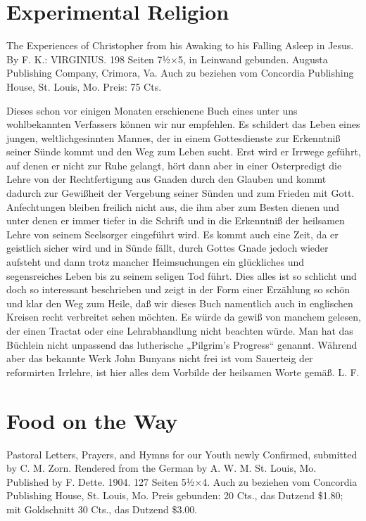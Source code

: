 \section[Experimental Religion]{Experimental Religion}
The Experiences of Christopher from his Awaking to his Falling Asleep in Jesus. By F. K.: VIRGINIUS. 198 Seiten 7½×5, in Leinwand gebunden. Augusta Publishing Company, Crimora, Va. Auch zu beziehen vom Concordia Publishing House, St. Louis, Mo. Preis: 75 Cts.

Dieses schon vor einigen Monaten erschienene Buch eines unter uns wohlbekannten Verfassers können wir nur empfehlen. Es schildert das Leben eines jungen, weltlichgesinnten Mannes, der in einem Gottesdienste zur Erkenntniß seiner Sünde kommt und den Weg zum Leben sucht. Erst wird er Irrwege geführt, auf denen er nicht zur Ruhe gelangt, hört dann aber in einer Osterpredigt die Lehre von der Rechtfertigung aus Gnaden durch den Glauben und kommt dadurch zur Gewißheit der Vergebung seiner Sünden und zum Frieden mit Gott. Anfechtungen bleiben freilich nicht aus, die ihm aber zum Besten dienen und unter denen er immer tiefer in die Schrift und in die Erkenntniß der heilsamen Lehre von seinem Seelsorger eingeführt wird. Es kommt auch eine Zeit, da er geistlich sicher wird und in Sünde fällt, durch Gottes Gnade jedoch wieder aufsteht und dann trotz mancher Heimsuchungen ein glückliches und segensreiches Leben bis zu seinem seligen Tod führt. Dies alles ist so schlicht und doch so interessant beschrieben und zeigt in der Form einer Erzählung so schön und klar den Weg zum Heile, daß wir dieses Buch namentlich auch in englischen Kreisen recht verbreitet sehen möchten. Es würde da gewiß von manchem gelesen, der einen Tractat oder eine Lehrabhandlung nicht beachten würde. Man hat das Büchlein nicht unpassend das lutherische „Pilgrim’s Progress“ genannt. Während aber das bekannte Werk John Bunyans nicht frei ist vom Sauerteig der reformirten Irrlehre, ist hier alles dem Vorbilde der heilsamen Worte gemäß. L. F.

\section[Food on the Way]{Food on the Way}
Pastoral Letters, Prayers, and Hymns for our Youth newly Confirmed, submitted by C. M. Zorn. Rendered from the German by A. W. M. St. Louis, Mo. Published by F. Dette. 1904. 127 Seiten 5½×4. Auch zu beziehen vom Concordia Publishing House, St. Louis, Mo. Preis gebunden: 20 Cts., das Dutzend \$1.80; mit Goldschnitt 30 Cts., das Dutzend \$3.00.

